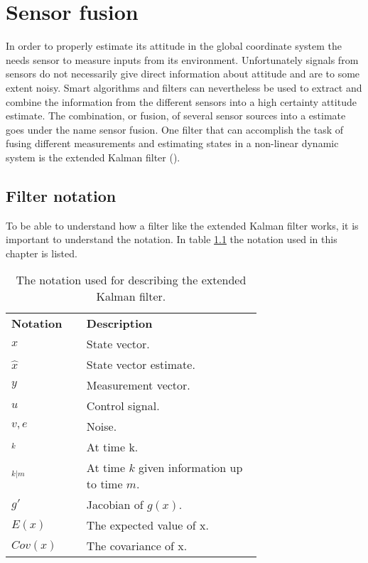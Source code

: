 \chapter{Sensor fusion}
In order to properly estimate its attitude in the global coordinate system the \abbrROV needs sensor to measure inputs from its environment.
Unfortunately signals from sensors do not necessarily give direct information about attitude and are to some extent noisy. Smart algorithms and filters can nevertheless be used to extract and combine the information from the different sensors into a high certainty attitude estimate. The combination, or fusion, of several sensor sources into a estimate goes under the name sensor fusion. One filter that can accomplish the task of fusing different measurements and estimating states in a non-linear dynamic system is the extended Kalman filter (\abbrEKF). 
\section{Filter notation}
To be able to understand how a filter like the extended Kalman filter works, it is important to understand the notation. In table \ref{tab:notationKalman} the notation used in this chapter is listed.
 \begin{table}[htbp]
  \centering
  \caption{\label{tab:notationKalman}%
    The notation used for describing the extended Kalman filter.}
    \begin{tabular}{l p{0.7\linewidth}}
    \toprule%
    \textbf{Notation} & \textbf{Description} \\
    \otoprule%
    $x$ & State vector.\\
    $\hat{x}$ & State vector estimate.\\
    $y$    & Measurement vector.\\
    $u$ & Control signal.\\
    $v,e$ & Noise.\\
    $_k$ & At time k.\\
    $_{k|m}$ & At time $k$ given information up to time $m$.\\
    $g'$ & Jacobian of $g(x)$.\\
    $E(x)$ & The expected value of x.\\
    $Cov(x)$ & The covariance of x.\\
    \bottomrule%
 \end{tabular}
\end{table}

